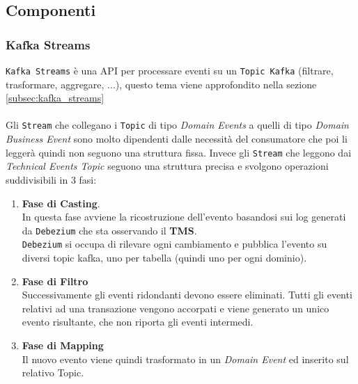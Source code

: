 \subsection{Componenti}
\label{subsec:components}

\subsubsection{Kafka Streams}
\label{subsubsec:kafka_stream}
\texttt{Kafka Streams} è una API per processare eventi su un \texttt{Topic Kafka} (filtrare, trasformare, aggregare, ...), questo tema viene approfondito nella sezione \ref{subsec:kafka_streams}\\
\\
Gli \texttt{Stream} che collegano i \texttt{Topic} di tipo \textit{Domain Events} a quelli di tipo \textit{Domain Business Event} sono molto dipendenti dalle necessità del consumatore che poi li leggerà quindi non seguono una struttura fissa.
Invece gli \texttt{Stream} che leggono dai \textit{Technical Events Topic} seguono una struttura precisa e svolgono operazioni suddivisibili in 3 fasi:
\begin{enumerate}
    \item \textbf{Fase di Casting}.\\
    In questa fase avviene la ricostruzione dell'evento basandosi sui log generati da \texttt{Debezium} che sta osservando il \textbf{TMS}.\\
    \texttt{Debezium} si occupa di rilevare ogni cambiamento e pubblica l'evento su diversi topic kafka, uno per tabella (quindi uno per ogni dominio). 
    \item \textbf{Fase di Filtro}\\
    Successivamente gli eventi ridondanti devono essere eliminati. Tutti gli eventi relativi ad una transazione vengono accorpati e viene generato un unico evento risultante, che non riporta gli eventi intermedi. 
    \item \textbf{Fase di Mapping}\\
    Il nuovo evento viene quindi trasformato in un \textit{Domain Event} ed inserito sul relativo Topic.
\end{enumerate}

